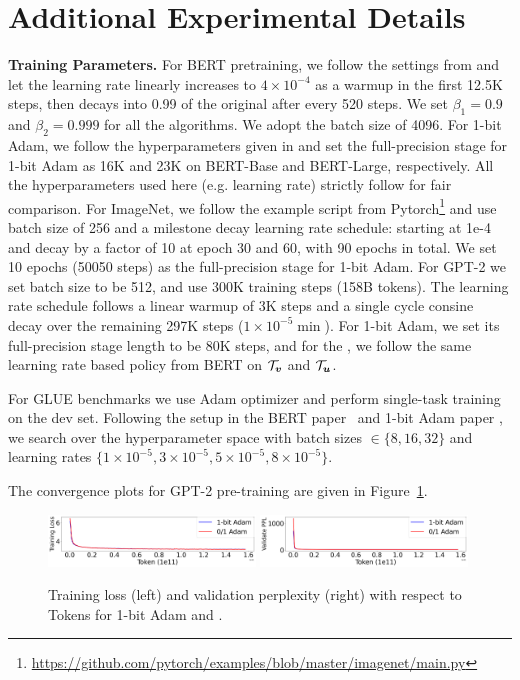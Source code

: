 \section{Additional Experimental Details}
\label{appendix:sec:exp}
\textbf{Training Parameters.}
For BERT pretraining, we follow the settings from \citep{devlin2018bert} and let the learning rate linearly increases to $4\times 10^{-4}$ as a warmup in the first 12.5K steps, then decays into 0.99 of the original after
every 520 steps. We set $\beta_1=0.9$ and $\beta_2=0.999$ for all the algorithms. We adopt the batch size of 4096. For 1-bit Adam, we follow the hyperparameters given in \citep{tang20211} and set the full-precision stage for 1-bit Adam as 16K and 23K on BERT-Base and BERT-Large, respectively. 
All the hyperparameters used here (e.g. learning rate) strictly follow \citep{tang20211} for fair comparison.
For ImageNet, we follow the example script from Pytorch\footnote{\url{https://github.com/pytorch/examples/blob/master/imagenet/main.py}} and use batch size of 256 and a milestone decay learning rate schedule: starting at 1e-4 and decay by a factor of 10 at epoch 30 and 60, with 90 epochs in total. We set 10 epochs (50050 steps) as the full-precision stage for 1-bit Adam.
For GPT-2 we set batch size to be 512, and use 300K training steps (158B tokens). The learning rate schedule follows a linear warmup of 3K steps and a single cycle consine decay over the remaining 297K steps ($1\times 10^{-5}\min$). For 1-bit Adam, we set its full-precision stage length to be 80K steps, and for the {\myalgo}, we follow the same learning rate based policy from BERT on $\mathcal{T}_{\boldsymbol{v}}$ and $\mathcal{T}_{\boldsymbol{u}}$. 

For GLUE benchmarks we use Adam optimizer and perform single-task training on the dev set. Following the setup in the BERT paper~\citep{devlin2018bert} and 1-bit Adam paper \citep{tang20211}, we search over the hyperparameter space with batch sizes $\in\{8,16,32\}$ and learning rates $\{1\times 10^{-5},3\times 10^{-5},5\times 10^{-5},8\times 10^{-5}\}$.

The convergence plots for GPT-2 pre-training are given in Figure~\ref{exp:fig:gpt_converge}.
\begin{figure}[t!]
  \centering
  \includegraphics[width=0.49\textwidth]{./sections/figure/v3_gpt2_sample.png}
  \includegraphics[width=0.49\textwidth]{./sections/figure/v3_gpt2_val.png}
  \caption{Training loss (left) and validation perplexity (right) with respect to Tokens for 1-bit Adam and {\myalgo}.}
  \label{exp:fig:gpt_converge}
\end{figure}

